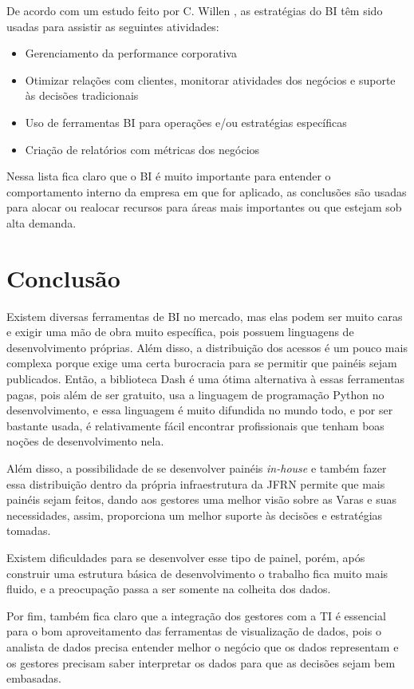 De acordo com um estudo feito por C. Willen \cite{willen1}, as estratégias do BI têm sido usadas para assistir as seguintes atividades:

\begin{itemize}
	\item Gerenciamento da performance corporativa
	\item Otimizar relações com clientes, monitorar atividades dos negócios e suporte às decisões tradicionais
	\item Uso de ferramentas BI para operações e/ou estratégias específicas
	\item Criação de relatórios com métricas dos negócios
\end{itemize}

Nessa lista fica claro que o BI é muito importante para entender o comportamento interno da empresa em que for aplicado, as conclusões são usadas para alocar ou realocar recursos para áreas mais importantes ou que estejam sob alta demanda.



%






\chapter{Conclusão}

Existem diversas ferramentas de BI no mercado, mas elas podem ser muito caras e exigir uma mão de obra muito específica, pois possuem linguagens de desenvolvimento próprias. Além disso, a distribuição dos acessos é um pouco mais complexa porque exige uma certa burocracia para se permitir que painéis sejam publicados. Então, a biblioteca Dash é uma ótima alternativa à essas ferramentas pagas, pois além de ser gratuito, usa a linguagem de programação Python no desenvolvimento, e essa linguagem é muito difundida no mundo todo, e por ser bastante usada, é relativamente fácil encontrar profissionais que tenham boas noções de desenvolvimento nela. 

Além disso, a possibilidade de se desenvolver painéis \textit{in-house} e também fazer essa distribuição dentro da própria infraestrutura da JFRN permite que mais painéis sejam feitos, dando aos gestores uma melhor visão sobre as Varas e suas necessidades, assim, proporciona um melhor suporte às decisões e estratégias tomadas. 

Existem dificuldades para se desenvolver esse tipo de painel, porém, após construir uma estrutura básica de desenvolvimento o trabalho fica muito mais fluido, e a preocupação passa a ser somente na colheita dos dados. 

Por fim, também fica claro que a integração dos gestores com a TI é essencial para o bom aproveitamento das ferramentas de visualização de dados, pois o analista de dados precisa entender melhor o negócio que os dados representam e os gestores precisam saber interpretar os dados para que as decisões sejam bem embasadas.